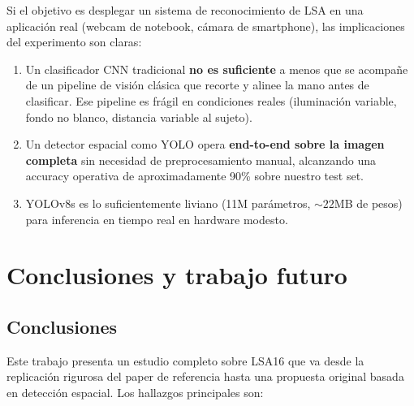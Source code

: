 \documentclass[a4paper,11pt]{article}
\begin{document}
Si el objetivo es desplegar un sistema de reconocimiento de LSA en una aplicación real (webcam de notebook, cámara de smartphone), las implicaciones del experimento son claras:

\begin{enumerate}[itemsep=2pt]
    \item Un clasificador CNN tradicional \textbf{no es suficiente} a menos que se acompañe de un pipeline de visión clásica que recorte y alinee la mano antes de clasificar. Ese pipeline es frágil en condiciones reales (iluminación variable, fondo no blanco, distancia variable al sujeto).
    \item Un detector espacial como YOLO opera \textbf{end-to-end sobre la imagen completa} sin necesidad de preprocesamiento manual, alcanzando una accuracy operativa de aproximadamente 90\% sobre nuestro test set.
    \item YOLOv8s es lo suficientemente liviano (11M parámetros, ${\sim}22$MB de pesos) para inferencia en tiempo real en hardware modesto.
\end{enumerate}

\section{Conclusiones y trabajo futuro}

\subsection{Conclusiones}

Este trabajo presenta un estudio completo sobre LSA16 que va desde la replicación rigurosa del paper de referencia hasta una propuesta original basada en detección espacial. Los hallazgos principales son:
\end{document}

